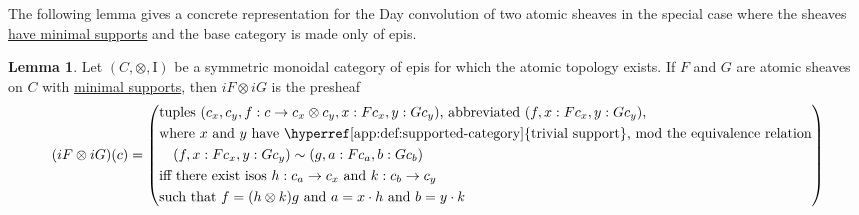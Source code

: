 \documentclass[
  sigconf,
  screen, ]{acmart}
\theoremstyle{definition}
\newtheorem{lemma}[theorem]{Lemma}
\newcommand\nref[2]{\hyperref[#1]{#2}} \newcommand\checkhigh{{\huge{\color{red}\textbf{TODO: check}}}}
\newcommand\monunit{\mathrm{I}}
\begin{document}
The following lemma gives a concrete representation for the
Day convolution of two atomic sheaves in the special case
where the sheaves \nref{app:def:supported-sheaf}{have minimal supports}
and the base category is made only of epis.

\begin{lemma} \label{app:lem:ussheaf-conv}
  Let $(C,\otimes,\monunit)$ be a symmetric monoidal category of epis
  for which the atomic topology exists.
  If $F$ and $G$ are atomic sheaves on $C$
  with \nref{app:def:supported-sheaf}{minimal supports},
  then $iF\otimes iG$
  is the presheaf
  \[ (iF\otimes iG)( c)
    = \left(\begin{aligned}
      &\text{tuples $( c_x, c_y, f :  c\to c_x\otimes  c_y, x : F c_x, y : G c_y)$, abbreviated $(f,x:F c_x,y:G c_y)$,} \\
      &\text{where $x$ and $y$ have \nref{app:def:supported-category}{trivial support},
       mod the equivalence relation} \\
      &\quad (f,x:F c_x,y:G c_y) \sim (g,a:F c_a,b:G c_b) \\
      &\text{iff there exist isos $h :  c_a\to  c_x$ and $k :  c_b\to  c_y$} \\
      &\text{such that $f = (h\otimes k)g$ and $a =x\cdot h$ and $b = y\cdot k$}
    \end{aligned}\right)
    \]
\end{lemma}
\end{document}
